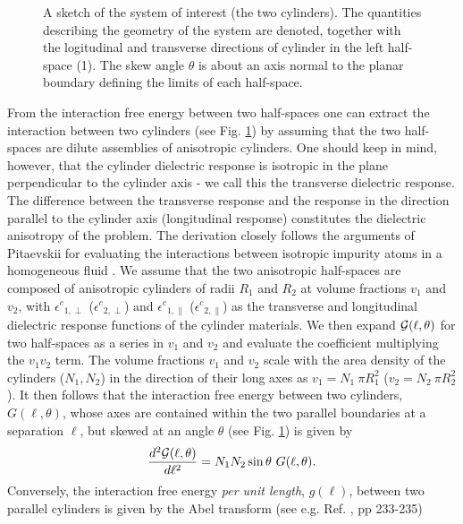 \documentclass[onecolumn,letterpaper,amsmath,amssymb,floatfix,aps,superscriptaddress]{revtex4}
\begin{document}
\begin{figure}
\centerline{
}
\caption{A sketch of the system of interest (the two cylinders). The quantities describing the geometry of the system are 
denoted, together with the logitudinal and transverse directions of cylinder in the left half-space (1). The skew angle $\theta$ is about an axis normal to the planar boundary defining the limits of each half-space.
}
\label{fig:sketch}
\end{figure}


From the interaction free energy between two half-spaces one can extract the interaction between two cylinders (see Fig. \ref{fig:sketch}) by assuming that the two half-spaces are 
dilute assemblies of anisotropic cylinders. One should keep in mind, however, that the cylinder dielectric response is isotropic in the plane perpendicular 
to the cylinder axis - we call this the transverse dielectric response. The difference between the transverse response and the response in the direction parallel 
to the cylinder axis (longitudinal response) constitutes the dielectric anisotropy of the problem. The derivation closely follows the arguments of Pitaevskii 
for evaluating the interactions between isotropic impurity 
atoms in a homogeneous fluid \cite{Pitaevskii}. 
We assume that the two anisotropic half-spaces are composed of anisotropic cylinders of radii $R_1$ and $R_2$ at volume fractions $v_1$ and $v_2$, with 
${\epsilon^{c}}_{1,\perp}$ (${\epsilon^{c}}_{2,\perp}$) and ${\epsilon^{c}}_{1,\parallel}$ (${\epsilon^{c}}_{2,\parallel}$) as the 
transverse and longitudinal dielectric response functions of the cylinder materials. We then expand ${\cal G}(\ell,\theta)$ for two half-spaces 
as a series in $v_1$ and $v_2$ and evaluate the coefficient multiplying the $v_1 v_2$ term. The volume 
fractions $v_1$ and $v_2$ scale with the area density of the cylinders ($N_1, N_2$) in the direction of their long axes as $v_1 = N_1~\pi R_1^{2}$ ($v_2 = N_2~\pi R_2^{2}$). It then follows \cite{Parsegian} that the interaction free energy between two cylinders, $G(\ell,\theta)$, whose axes are contained within the two parallel boundaries 
at a separation $\ell$, but skewed at an angle $\theta$ (see Fig. \ref{fig:sketch}) is given by 
\begin{equation}
\frac{d^{2}{\cal G}(\ell,\theta)}{d\ell^{2}}= N_1 N_2\sin{\theta}~G(\ell,\theta).
\label{form1}
\end{equation}
Conversely, the interaction free energy {\sl per unit length}, $g(\ell)$, between two parallel cylinders is given by the Abel transform (see e.g. Ref. , pp 233-235)
\end{document}
